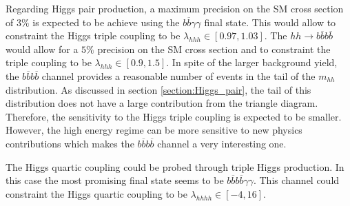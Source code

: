 Regarding Higgs pair production, a maximum precision on the SM cross section of $3\%$ is expected to be achieve using the $b\overline{b}\gamma\gamma$ final state. This would allow to constraint the Higgs triple coupling to be $\lambda_{hhh}\in [0.97,1.03]$. The $hh\rightarrow b\overline{b}b\overline{b}$ would allow for a $5\%$ precision on the SM cross section and to constraint the triple coupling to be $\lambda_{hhh}\in [0.9,1.5]$. In spite of the larger background yield, the $b\overline{b}b\overline{b}$ channel provides a reasonable number of events in the tail of the $m_{hh}$ distribution. As discussed in section \ref{section:Higgs_pair}, the tail of this distribution does not have a large contribution from the triangle diagram. Therefore, the sensitivity to the Higgs triple coupling is expected to be smaller. However, the high energy regime can be more sensitive to new physics contributions which makes the $b\overline{b}b\overline{b}$ channel a very interesting one. 

The Higgs quartic coupling could be probed through triple Higgs production. In this case the most promising final state seems to be $b\overline{b}b\overline{b}\gamma\gamma$. This channel could constraint the Higgs quartic coupling to be $\lambda_{hhhh}\in [-4,16]$.